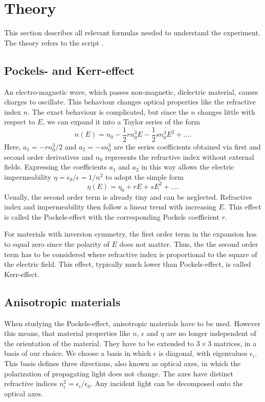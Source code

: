 \section{Theory}
\label{sec:theorie}
This section describes all relevant formulas needed to understand the experiment. The theory refers to the script \cite{eom}. 
\subsection{Pockels- and Kerr-effect}
An electro-magnetic wave, which passes non-magnetic, dielectric material, causes charges to oscillate. This behaviour changes optical properties like the refractive index $n$. The exact behaviour is complicated, but since the $n$ changes little with respect to $E$, we can expand it into a Taylor series of the form
\begin{equation}
	n(E)=n_0 - \frac{1}{2}rn_0^3E - \frac{1}{2}sn_0^3E^2 + \dots.
\end{equation}
Here, $a_1 = -rn_0^3/2$ and $a_2 = -sn_0^3$ are the series coefficients obtained via first and second order derivatives and $n_0$ represents the refractive index without external fields. Expressing the coefficients $a_1$ and $a_2$ in this way allows the electric impermeability $\eta = \epsilon_0/\epsilon = 1/n^2$ to adopt the simple form
\begin{equation}\label{eqn:eta}
	\eta(E) = \eta_0 + rE + sE^2 + \dots.
\end{equation}
Usually, the second order term is already tiny and can be neglected. Refractive index and impermeability then follow a linear trend with increasing $E$. This effect is called the Pockels-effect with the corresponding Pockels coefficient $r$. 

For materials with inversion symmetry, the first order term in the expansion has to equal zero since the polarity of $E$ does not matter. Thus, the the second order term has to be considered where refractive index is proportional to the square of the electric field. This effect, typically much lower than Pockels-effect, is called Kerr-effect. 

\subsection{Anisotropic materials}
When studying the Pockels-effect, anisotropic materials have to be used. However this means, that material properties like $n$, $\epsilon$ and $\eta$ are no longer independent of the orientation of the material. They have to be extended to $3\times3$ matrices, in a basis of our choice. We choose a basis in which $\epsilon$ is diagonal, with eigenvalues $\epsilon_i$. This basis defines three directions, also known as optical axes, in which the polarization of propagating light does not change. The axes have distinct refractive indices $n_i^2 = \epsilon_i/\epsilon_0$. Any incident light can be decomposed onto the optical axes.

